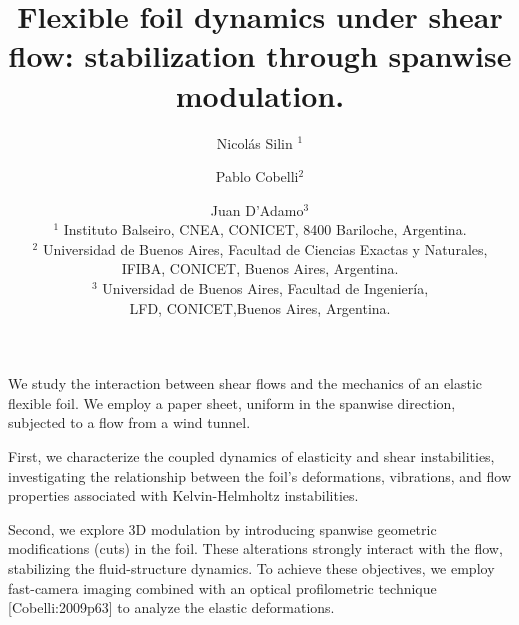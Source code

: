 \documentclass[a4paper,11pt]{article}
\begin{document}
\vspace{-1.0cm}

\title{Flexible foil dynamics under shear flow: stabilization through spanwise modulation.}

\author{Nicolás Silin $^1$\and  Pablo Cobelli$^2$ \and Juan D'Adamo$^{3}$\\
  $^1$ Instituto Balseiro, CNEA, CONICET,  8400 Bariloche, Argentina. \\
  $^2$ Universidad de Buenos Aires, Facultad de Ciencias Exactas y Naturales,\\  IFIBA, CONICET,   Buenos Aires,  Argentina.\\
  $^3$ Universidad de Buenos Aires, Facultad de Ingenier\'ia, \\LFD, CONICET,Buenos Aires, Argentina.
}
\date{}
\maketitle
We study the interaction between shear flows and the mechanics of an elastic flexible foil. We employ a paper sheet, uniform in the spanwise direction,  subjected to a flow from a wind tunnel.

First, we characterize the coupled dynamics of elasticity and shear instabilities, investigating the relationship between the foil's deformations, vibrations, and flow properties associated with Kelvin-Helmholtz instabilities.

Second, we explore 3D modulation by introducing spanwise geometric modifications (cuts) in the foil. These alterations strongly interact with the flow,  stabilizing the fluid-structure dynamics. To achieve these objectives, we employ   fast-camera imaging combined with an optical profilometric technique [Cobelli:2009p63] to analyze the elastic deformations.




	
	
\end{document}
